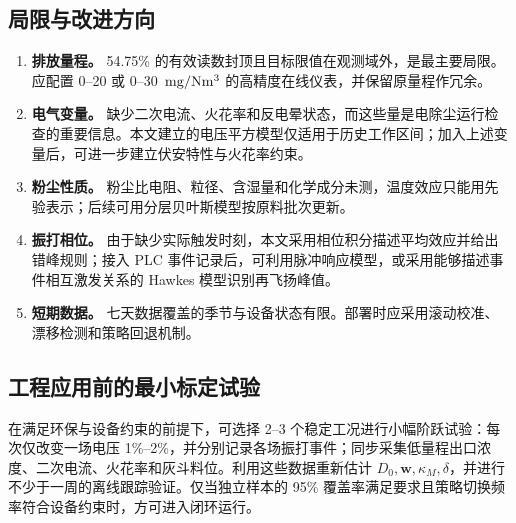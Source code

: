 \subsection{局限与改进方向}

\begin{enumerate}
  \item \textbf{排放量程。} 54.75\% 的有效读数封顶且目标限值在观测域外，是最主要局限。应配置 0--20 或 0--30 $\,\mathrm{mg/Nm^3}$ 的高精度在线仪表，并保留原量程作冗余。
  \item \textbf{电气变量。} 缺少二次电流、火花率和反电晕状态，而这些量是电除尘运行检查的重要信息\cite{szabo1981inspection}。本文建立的电压平方模型仅适用于历史工作区间；加入上述变量后，可进一步建立伏安特性与火花率约束。
  \item \textbf{粉尘性质。} 粉尘比电阻、粒径、含湿量和化学成分未测，温度效应只能用先验表示；后续可用分层贝叶斯模型按原料批次更新。
  \item \textbf{振打相位。} 由于缺少实际触发时刻，本文采用相位积分描述平均效应并给出错峰规则；接入 PLC 事件记录后，可利用脉冲响应模型，或采用能够描述事件相互激发关系的 Hawkes 模型识别再飞扬峰值。
  \item \textbf{短期数据。} 七天数据覆盖的季节与设备状态有限。部署时应采用滚动校准、漂移检测和策略回退机制。
\end{enumerate}

\subsection{工程应用前的最小标定试验}

在满足环保与设备约束的前提下，可选择 2--3 个稳定工况进行小幅阶跃试验：每次仅改变一场电压 1\%--2\%，并分别记录各场振打事件；同步采集低量程出口浓度、二次电流、火花率和灰斗料位。利用这些数据重新估计 $D_0,\bm w,\kappa_M,\delta$，并进行不少于一周的离线跟踪验证。仅当独立样本的 95\% 覆盖率满足要求且策略切换频率符合设备约束时，方可进入闭环运行。
